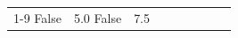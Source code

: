 \begin{table}[H]
\begin{tabular}{lllrlllll}
\cline{1-9}
False & 5.0%
\cline{1-9}
False & 7.5%

\end{tabular}
\end{table}
